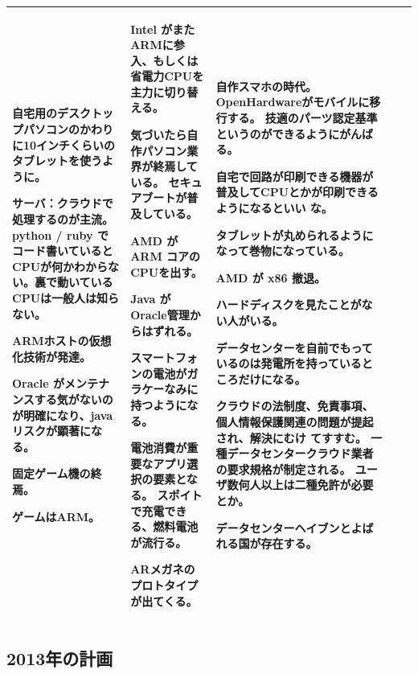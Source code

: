 \documentclass[mingoth,a4paper]{jsarticle}
\begin{document}
{\begin{tabular}[t]{|p{8em}|p{8em}|p{12em}|p{8em}|p{8em}|}
自宅用のデスクトップパソコンのかわりに10インチくらいのタブレットを使うよ
	 うに。

サーバ：クラウドで処理するのが主流。python / ruby でコード書いていると
	 CPUが何かわからない。裏で動いているCPUは一般人は知らない。

ARMホストの仮想化技術が発達。

Oracle がメンテナンスする気がないのが明確になり、java リスクが顕著になる。

固定ゲーム機の終焉。

ゲームはARM。

 & 

Intel がまたARMに参入、もしくは省電力CPUを主力に切り替える。

気づいたら自作パソコン業界が終焉している。
セキュアブートが普及している。

AMD が ARM コアのCPUを出す。

Java が Oracle管理からはずれる。

スマートフォンの電池がガラケーなみに持つようになる。

電池消費が重要なアプリ選択の要素となる。
スポイトで充電できる、燃料電池が流行る。

ARメガネのプロトタイプが出てくる。

 & 

自作スマホの時代。
OpenHardwareがモバイルに移行する。
技適のパーツ認定基準というのができるようにがんばる。

自宅で回路が印刷できる機器が普及してCPUとかが印刷できるようになるといい
		 な。

タブレットが丸められるようになって巻物になっている。

AMD が x86 撤退。

ハードディスクを見たことがない人がいる。

データセンターを自前でもっているのは発電所を持っているところだけになる。

クラウドの法制度、免責事項、個人情報保護関連の問題が提起され、解決にむけ
		 てすすむ。
一種データセンタークラウド業者の要求規格が制定される。
ユーザ数何人以上は二種免許が必要とか。

データセンターヘイブンとよばれる国が存在する。

\\

\hline
\end{tabular}

}


\subsection{2013年の計画}
\end{document}

